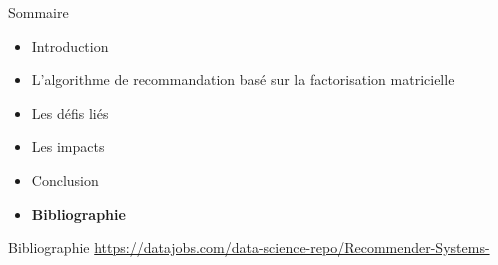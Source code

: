 \begin{frame}{Sommaire}
    \begin{itemize}
        \item Introduction
        \item L'algorithme de recommandation basé sur la factorisation matricielle
        \item Les défis liés
        \item Les impacts
        \item Conclusion
        \item \textbf{Bibliographie}
    \end{itemize}
\end{frame}

\begin{frame}{Bibliographie}
    \hyperref[Matrix Factorization Techniques for Recommender Systems]{https://datajobs.com/data-science-repo/Recommender-Systems-%
    }
\end{frame}